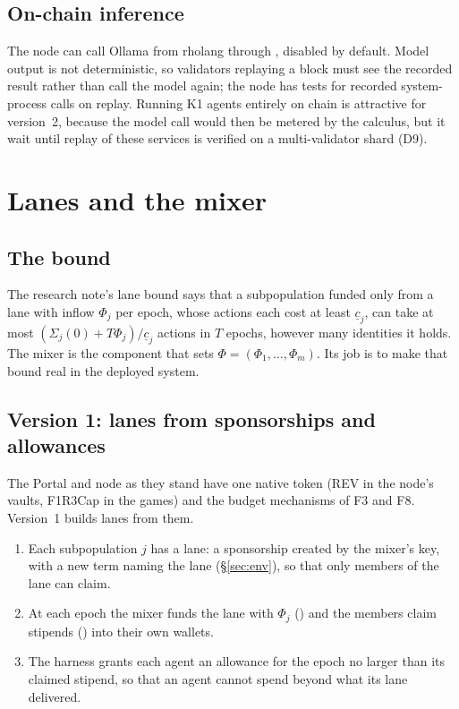 \documentclass[11pt,a4paper]{article}
\begin{document}
\subsection{On-chain inference}

The node can call Ollama from rholang through , disabled by default. Model
output is not deterministic, so validators replaying a block must see the recorded result rather
than call the model again; the node has tests for recorded system-process calls on replay. Running
K1 agents entirely on chain is attractive for version~2, because the model call would then be
metered by the calculus, but it \MUST{} wait until replay of these services is verified on a
multi-validator shard (D9).

\section{Lanes and the mixer}\label{sec:mixer}

\subsection{The bound}

The research note's lane bound says that a subpopulation funded only from a lane with inflow
$\Phi_j$ per epoch, whose actions each cost at least $\underline{c}_j$, can take at most
$(\Sigma_j(0)+T\Phi_j)/\underline{c}_j$ actions in $T$ epochs, however many identities it holds.
The mixer is the component that sets $\Phi=(\Phi_1,\dots,\Phi_m)$. Its job is to make that bound
real in the deployed system.

\subsection{Version 1: lanes from sponsorships and allowances}

The Portal and node as they stand have one native token (REV in the node's vaults, F1R3Cap in the games) and the
budget mechanisms of F3 and F8. Version~1 builds lanes from them.

\begin{enumerate}[itemsep=2pt]
\item Each subpopulation $j$ has a lane: a sponsorship created by the mixer's key, with a new term
   naming the lane (\S\ref{sec:env}), so that only members of the lane can claim.
\item At each epoch the mixer funds the lane with $\Phi_j$ () and the members
  claim stipends () into their own wallets.
\item The harness grants each agent an allowance for the epoch no larger than its claimed stipend,
  so that an agent cannot spend beyond what its lane delivered.
\end{enumerate}
\end{document}
